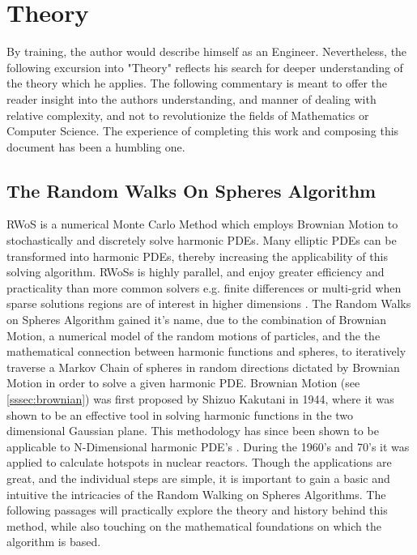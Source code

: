 \chapter{Theory}
\label{chapter:Theory}

By training, the author would describe himself as an Engineer.  Nevertheless,
the following excursion into "Theory" reflects his search for deeper understanding
of the theory which he applies.  The following commentary is meant to offer the reader
insight into the authors understanding, and manner of dealing with relative complexity,
and not to revolutionize the fields of Mathematics or Computer Science.  The
experience of completing this work and composing this document has been a humbling one.

\section{The Random Walks On Spheres Algorithm}

\Gls{RWoS} is a numerical Monte Carlo Method which employs Brownian Motion
to stochastically and discretely solve
harmonic \glspl{PDE}.  Many elliptic \glspl{PDE} can be transformed into harmonic \glspl{PDE},
thereby increasing the applicability of this solving algorithm\cite{?}. \Glspl{RWoS} is highly parallel, %
and enjoy greater efficiency and practicality than more common solvers e.g.
finite differences or multi-grid when sparse solutions regions are of
interest in higher dimensions \cite{DeLaurentis}.  The Random Walks on Spheres Algorithm
gained it's name, due to the combination of Brownian Motion, a numerical model
of the random motions of particles, and the the mathematical connection between
harmonic functions and spheres\cite{Axler1992}, to iteratively traverse a Markov
Chain of spheres in random directions dictated by Brownian Motion in order to solve a given harmonic PDE.
Brownian Motion (see \ref{sssec:brownian}) was first %
proposed by Shizuo Kakutani in 1944\cite{kakutani}, where it was shown to be an effective tool
in solving harmonic functions in the two dimensional Gaussian plane.  This methodology has since been
shown to be applicable to N-Dimensional harmonic PDE's \cite{DeLaurentis}.  During the 1960's
and 70's it was applied to calculate hotspots in nuclear reactors\cite{Bornemann}.
Though the applications are great, and the individual steps are simple, it is important to
 gain a basic and intuitive the intricacies of the Random Walking on Spheres Algorithms.
The following passages will practically explore the theory and history behind this method,
while also touching on the mathematical foundations on which the algorithm is based.

